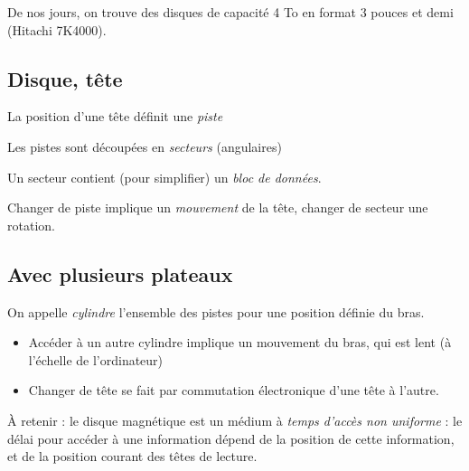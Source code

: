 \begin{multicols}{2}

De nos jours, on trouve des disques de capacité 4 To en format 3 pouces et demi
(Hitachi 7K4000).



\subsection{Disque, tête}


La position d'une tête  définit  une \emph{piste}


Les pistes sont découpées  en \emph{secteurs} (angulaires)


Un secteur contient (pour simplifier) un  \emph{bloc de données}.



Changer de piste implique un  \emph{mouvement} de la tête, changer de secteur
une rotation.


\subsection{Avec plusieurs plateaux}


On appelle \emph{cylindre} l'ensemble des pistes pour une position
définie du bras.


\begin{itemize}
\item Accéder à un autre cylindre implique un mouvement du bras, qui est lent (à l'échelle de l'ordinateur)
\item Changer de tête se fait par commutation électronique d'une tête à l'autre.
\end{itemize}



À retenir : le disque magnétique est un médium à \emph{temps d'accès
  non uniforme} : le délai pour accéder à une information dépend de la
position de cette information, et de la position courant des têtes de
lecture.


\end{multicols}
